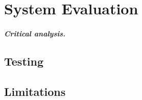 \chapter{System Evaluation}
\paragraph{Critical analysis.}
\section{Testing}

\section{Limitations}
